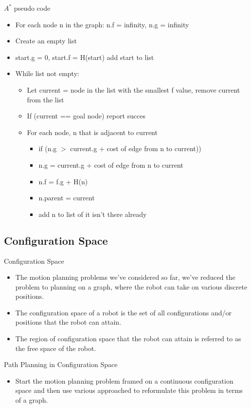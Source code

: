 \documentclass[10pt,mathserif]{beamer}
\begin{document}
\begin{frame}{$A^*$ pseudo code}
\begin{itemize}
\item For each node n in the graph: n.f = infinity, n.g = infinity
\item Create an empty list
\item start.g = 0, start.f = H(start) add start to list
\item While list not empty:
\begin{itemize}
\item Let current = node in the list with the smallest f value, remove current from the list
\item If (current == goal node) report succes
\item For each node, n that is adjacent to current
\begin{itemize}
\item if (n.g $>$ current.g + cost of edge from n to current))
\item n.g = current.g + cost of edge from n to current
\item n.f = f.g + H(n)
\item n.parent = current
\item add n to list of it isn't there already
\end{itemize}
\end{itemize}
\end{itemize}
\end{frame}

\subsection{Configuration Space}

\begin{frame}{Configuration Space}
\begin{itemize}
\item The motion planning problems we've considered so far, we've reduced the problem to planning on a graph, where the robot can take
on various discrete positions.
\item The configuration space of a robot is the set of all configurations and/or positions that the robot can attain.
\item The region of configuration space that the robot can attain is referred to as the free space of the robot.
\end{itemize}
\end{frame}


\begin{frame}{Path Planning in Configuration Space}
\begin{itemize}
\item Start the motion planning problem framed on a continuous configuration space and then use 
various approached to reformulate this problem in terms of a graph. 
\end{itemize}
\end{frame}
\end{document}
